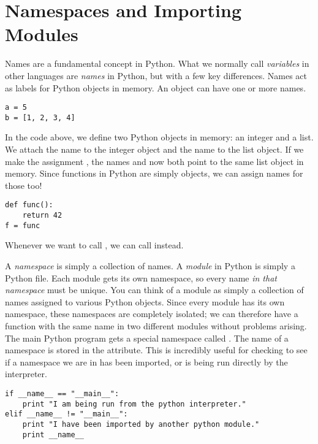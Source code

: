 \section*{Namespaces and Importing Modules}
Names are a fundamental concept in Python.
What we normally call \emph{variables} in other languages are \emph{names} in Python, but with a few key differences.
Names act as labels for Python objects in memory.
An object can have one or more names.
\begin{lstlisting}
a = 5
b = [1, 2, 3, 4]
\end{lstlisting}
In the code above, we define two Python objects in memory: an integer and a list.
We attach the name  to the integer object and the name  to the list object.
If we make the assignment , the names  and  now both point to the same list object in memory.
Since functions in Python are simply objects, we can assign names for those too!
\begin{lstlisting}
def func():
    return 42
f = func
\end{lstlisting}
Whenever we want to call , we can call  instead.

A \emph{namespace} is simply a collection of names.
A \emph{module} in Python is simply a Python file.
Each module gets its own namespace, so every name \emph{in that namespace} must be unique.
You can think of a module as simply a collection of names assigned to various Python objects.
Since every module has its own namespace, these namespaces are completely isolated; we can therefore have a function with the same name in two different modules without problems arising.
The main Python program gets a special namespace called .
The name of a namespace is stored in the  attribute.
This is incredibly useful for checking to see if a namespace we are in has been imported, or is being run directly by the interpreter.
\begin{lstlisting}
if __name__ == "__main__":
    print "I am being run from the python interpreter."
elif __name__ != "__main__":
    print "I have been imported by another python module."
    print __name__
\end{lstlisting}

